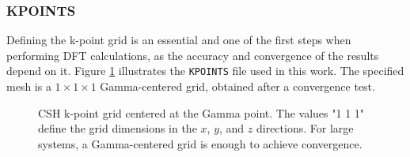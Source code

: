 \subsubsection{KPOINTS}
Defining the k-point grid is an essential and one of the first steps when performing DFT calculations, as the accuracy and convergence of the results depend on it. Figure \ref{kpoints} illustrates the \texttt{KPOINTS} file used in this work. The specified mesh is a $1\times 1\times 1$ Gamma-centered grid, obtained after a convergence test. 
\begin{figure}[H]
	\centering
	\caption{CSH k-point grid centered at the Gamma point. The values "1 1 1" define the grid dimensions in the $x$, $y$, and $z$ directions. For large systems, a Gamma-centered grid is enough to achieve convergence.}
	\label{kpoints}
\end{figure}

